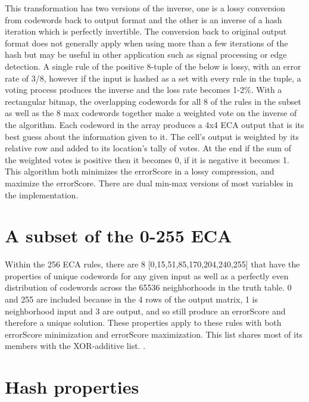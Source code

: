 \documentclass[11pt]{article}
\begin{document}
This transformation has two versions of the inverse, one is a lossy conversion from codewords back to output format and the other is an inverse of a hash iteration which is perfectly invertible. The conversion back to original output format does not generally apply when using more than a few iterations of the hash but may be useful in other application such as signal processing or edge detection. A single rule of the positive 8-tuple of the below is lossy, with an error rate of 3/8, however if the input is hashed as a set with every rule in the tuple, a voting process produces the inverse and the loss rate becomes 1-2\%. With a rectangular bitmap, the overlapping codewords for all 8 of the rules in the subset as well as the 8 max codewords together make a weighted vote on the inverse of the algorithm. Each codeword in the array produces a 4x4 ECA output that is its best guess about the information given to it. The cell's output is weighted by its relative row and added to its location's tally of votes. At the end if the sum of the weighted votes is positive then it becomes 0, if it is negative it becomes 1. \\

This algorithm both minimizes the errorScore in a lossy compression, and maximize the errorScore. There are dual min-max versions of most variables in the implementation. \\

\section{A subset of the 0-255 ECA}

Within the 256 ECA rules, there are 8 [0,15,51,85,170,204,240,255] that have the properties of unique codewords for any given input as well as a perfectly even distribution of codewords across the 65536 neighborhoods in the truth table. 0 and 255 are included because in the 4 rows of the output matrix, 1 is neighborhood input and 3 are output, and so still produce an errorScore and therefore a unique solution. These properties apply to these rules with both errorScore minimization and errorScore maximization. This list shares most of its members with the XOR-additive list. \cite{xorAdditive}.\\

\section{Hash properties}
\end{document}
